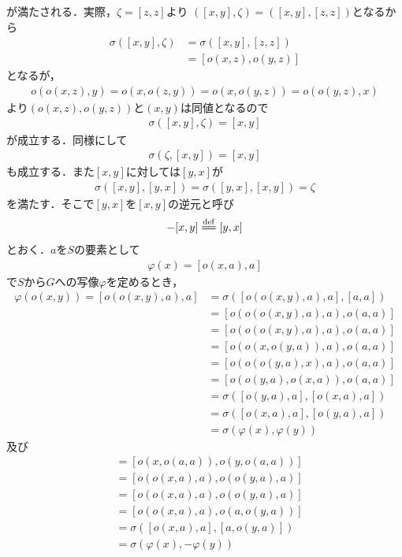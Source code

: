 	が満たされる．実際，$\zeta = [z,z]$より
	$\left( [x,y],\zeta \right) = \left( [x,y],[z,z] \right)$となるから
	\begin{align}
		\sigma \left( [x,y],\zeta \right)
		&= \sigma \left( [x,y],[z,z] \right) \\
		&= \left[ o(x,z), o(y,z) \right]
	\end{align}
	となるが，
	\begin{align}
		o(o(x,z),y) = o(x,o(z,y)) = o(x,o(y,z)) = o(o(y,z),x)
	\end{align}
	より$(o(x,z),o(y,z))$と$(x,y)$は同値となるので
	\begin{align}
		\sigma \left( [x,y],\zeta \right) = [x,y]
	\end{align}
	が成立する．同様にして
	\begin{align}
		\sigma \left( \zeta,[x,y] \right) = [x,y]
	\end{align}
	も成立する．また$[x,y]$に対しては$[y,x]$が
	\begin{align}
		\sigma([x,y],[y,x]) = \sigma([y,x],[x,y]) = \zeta
	\end{align}
	を満たす．そこで$[y,x]$を$[x,y]$の逆元と呼び
	\begin{align}
		-[x,y] \defeq [y,x]
	\end{align}
	とおく．$a$を$S$の要素として
	\begin{align}
		\varphi(x) = [o(x,a),a]
	\end{align}
	で$S$から$G$への写像$\varphi$を定めるとき，
	\begin{align}
		\varphi(o(x,y)) = [o(o(x,y),a),a]
		&= \sigma \left( [o(o(x,y),a),a],[a,a] \right) \\
		&= [o(o(o(x,y),a),a),o(a,a)] \\
		&= [o(o(o(x,y),a),a),o(a,a)] \\
		&= [o(o(x,o(y,a)),a),o(a,a)] \\
		&= [o(o(o(y,a),x),a),o(a,a)] \\
		&= [o(o(y,a),o(x,a)),o(a,a)] \\
		&= \sigma \left( [o(y,a),a],[o(x,a),a] \right) \\
		&= \sigma \left( [o(x,a),a],[o(y,a),a] \right) \\
		&= \sigma \left( \varphi(x),\varphi(y) \right)
	\end{align}
	及び
	\begin{align}
		[x,y] &= [o(x,o(a,a)),o(y,o(a,a))] \\
		&= [o(o(x,a),a),o(o(y,a),a)] \\
		&= [o(o(x,a),a),o(o(y,a),a)] \\
		&= [o(o(x,a),a),o(a,o(y,a))] \\
		&= \sigma \left( [o(x,a),a],[a,o(y,a)] \right) \\
		&= \sigma \left( \varphi(x),-\varphi(y) \right)
	\end{align}
